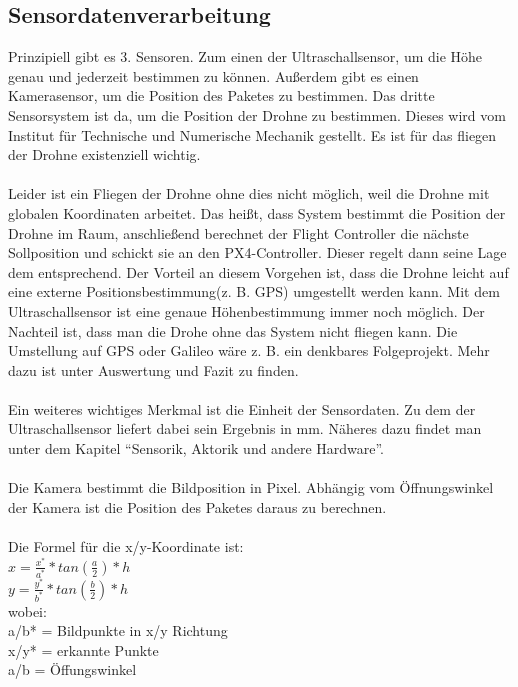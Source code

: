 \subsection{Sensordatenverarbeitung}
Prinzipiell gibt es 3. Sensoren. Zum einen der Ultraschallsensor, um die Höhe genau und jederzeit bestimmen zu können. Außerdem gibt es einen Kamerasensor, um die Position des Paketes zu bestimmen. Das dritte Sensorsystem ist da, um die Position der Drohne zu bestimmen. Dieses wird vom Institut für Technische und Numerische Mechanik gestellt. Es ist für das fliegen der Drohne existenziell wichtig.\\
\\
Leider ist ein Fliegen der Drohne ohne dies nicht möglich, weil die Drohne mit globalen Koordinaten arbeitet. Das heißt, dass System bestimmt die Position der Drohne im Raum, anschließend berechnet der Flight Controller die nächste Sollposition und schickt sie an den PX4-Controller. Dieser regelt dann seine Lage dem entsprechend. Der Vorteil an diesem Vorgehen ist, dass die Drohne leicht auf eine externe Positionsbestimmung(z. B. GPS) umgestellt werden kann. 
Mit dem Ultraschallsensor ist eine genaue Höhenbestimmung immer noch möglich. Der Nachteil ist, dass man die Drohe ohne das System nicht fliegen kann. Die Umstellung auf GPS oder Galileo wäre z. B. ein denkbares Folgeprojekt. Mehr dazu ist unter Auswertung und Fazit zu finden.\\
\\
Ein weiteres wichtiges Merkmal ist die Einheit der Sensordaten. Zu dem der Ultraschallsensor liefert dabei sein Ergebnis in mm. Näheres dazu findet man unter dem Kapitel ``Sensorik, Aktorik und andere Hardware''.\\
\\
Die Kamera bestimmt die Bildposition in Pixel. Abhängig vom Öffnungswinkel der Kamera ist die Position des Paketes daraus zu berechnen.\\
\\
Die Formel für die x/y-Koordinate ist:\\
$x = \frac{x^*}{a^*} * tan(\frac{a}{2})*h$\\
$y = \frac{y^*}{b^*} * tan(\frac{b}{2})*h$\\
wobei:\\
a/b* = Bildpunkte in x/y Richtung\\
x/y* = erkannte Punkte\\
a/b = Öffungswinkel\\

